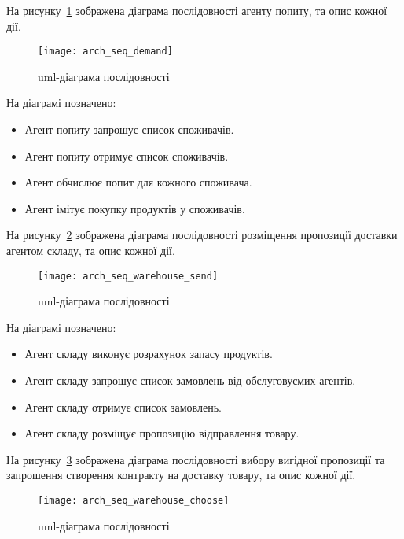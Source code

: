 На рисунку~\ref{fig:arch_seq_demand} зображена діаграма послідовності агенту попиту, та опис кожної дії.

\begin{figure}[H]
	\centering
	\texttt{[image: arch\_seq\_demand]}
	\caption{\acrshort{uml}-діаграма послідовності}
	\label{fig:arch_seq_demand}
\end{figure} 

На діаграмі позначено:
\begin{itemize}
	\item Агент попиту запрошує список споживачів.
	\item Агент попиту отримує список споживачів.
	\item Агент обчислює попит для кожного споживача.
	\item Агент імітує покупку продуктів у споживачів.
\end{itemize}

На рисунку~\ref{fig:arch_seq_warehouse_send} зображена діаграма послідовності розміщення пропозиції доставки агентом складу, та опис кожної дії.

\begin{figure}[H]
	\centering
	\texttt{[image: arch\_seq\_warehouse\_send]}
	\caption{\acrshort{uml}-діаграма послідовності}
	\label{fig:arch_seq_warehouse_send}
\end{figure} 

На діаграмі позначено:
\begin{itemize}
	\item Агент складу виконує розрахунок запасу продуктів.
	\item Агент складу запрошує список замовлень від обслуговуємих агентів.
	\item Агент складу отримує список замовлень.
	\item Агент складу розміщує пропозицію відправлення товару.
\end{itemize}

На рисунку~\ref{fig:arch_seq_warehouse_choose} зображена діаграма послідовності вибору вигідної пропозиції та запрошення створення контракту на доставку товару, та опис кожної дії.

\begin{figure}[H]
	\centering
	\texttt{[image: arch\_seq\_warehouse\_choose]}
	\caption{\acrshort{uml}-діаграма послідовності}
	\label{fig:arch_seq_warehouse_choose}
\end{figure} 

